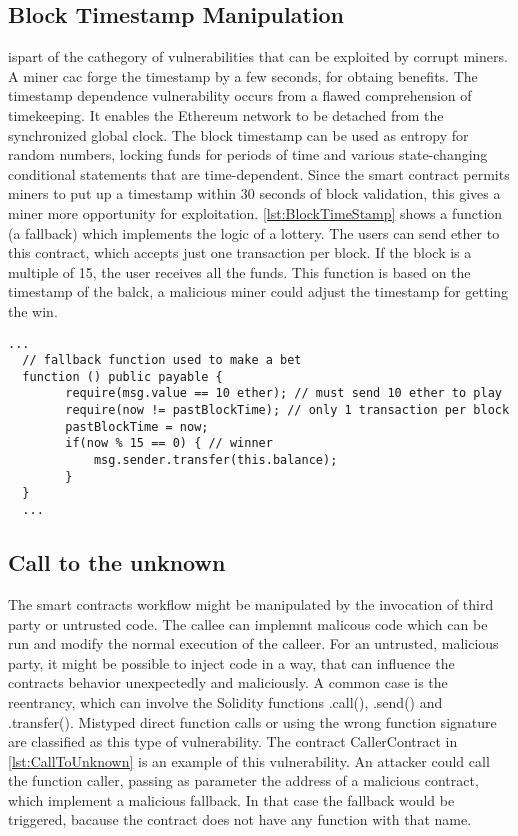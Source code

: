 \documentclass[a4paper,sigconf, language=french,
language=german, language=spanish, language=english]{acmart}
\begin{document}
\subsection{Block Timestamp Manipulation} ispart of the cathegory of vulnerabilities that can be exploited by corrupt miners. 
A miner cac forge the timestamp by a few seconds, for obtaing benefits. 
The timestamp dependence vulnerability occurs from a flawed comprehension of timekeeping. It enables the Ethereum
network to be detached from the synchronized global clock. 
The block timestamp can be used as entropy for random numbers, locking funds for periods of time and various state-changing 
conditional statements that are time-dependent. Since the smart contract permits miners to put up a
timestamp within 30 seconds of block validation, this gives a miner more opportunity for exploitation.
\autoref{lst:BlockTimeStamp} shows a function (a fallback) which implements the logic of a lottery. The users can send ether to this contract, which 
accepts just one transaction per block. If the block is a multiple of 15, the user receives all the funds. This function is based on the timestamp of the balck, 
a malicious miner could adjust the timestamp for getting the win.
\begin{lstlisting}[language=Solidity,caption={Block Timestamp},label={lst:BlockTimeStamp}]
  ...  
  // fallback function used to make a bet
  function () public payable {
        require(msg.value == 10 ether); // must send 10 ether to play
        require(now != pastBlockTime); // only 1 transaction per block
        pastBlockTime = now;
        if(now % 15 == 0) { // winner
            msg.sender.transfer(this.balance);
        }
  }
  ...
\end{lstlisting}

\subsection{Call to the unknown} The smart contracts workflow might be manipulated by 
the invocation of third party or untrusted code. The callee can implemnt malicous code which can be run and 
modify the normal execution of the calleer. For an untrusted, malicious
party, it might be possible to inject code in a way, that can inﬂuence the contracts behavior unexpectedly
and maliciously. A common case is the reentrancy, which can involve the Solidity functions .call(), .send() and .transfer(). 
Mistyped direct function calls or using the wrong function signature are classified as this type of vulnerability. 
The contract CallerContract in \autoref{lst:CallToUnknown} is an example of this vulnerability. An attacker could call the function caller, passing 
as parameter the address of a malicious contract, which implement a malicious fallback. In that case the fallback would be triggered, bacause the contract 
does not have any function with that name.
\end{document}
